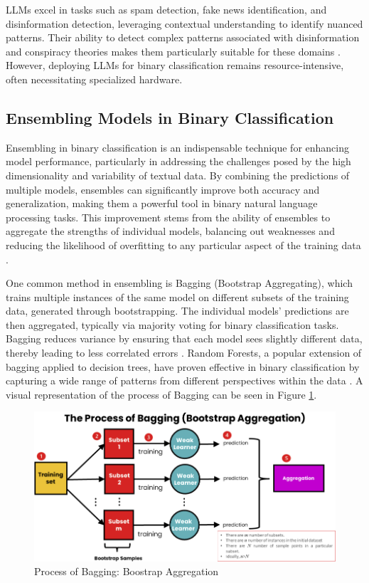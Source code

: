 \documentclass{Configuration_Files/PoliMi3i_thesis}
\begin{document}
LLMs excel in tasks such as spam detection, fake news identification, and disinformation detection, leveraging contextual understanding to identify nuanced patterns. Their ability to detect complex patterns associated with disinformation and conspiracy theories makes them particularly suitable for these domains \cite{vykopal2023disinformation}. However, deploying LLMs for binary classification remains resource-intensive, often necessitating specialized hardware.

\subsection{Ensembling Models in Binary Classification} \label{subsec:ensembling_models_in_binary_class}
Ensembling in binary classification is an indispensable technique for enhancing model performance, particularly in addressing the challenges posed by the high dimensionality and variability of textual data. By combining the predictions of multiple models, ensembles can significantly improve both accuracy and generalization, making them a powerful tool in binary natural language processing tasks. This improvement stems from the ability of ensembles to aggregate the strengths of individual models, balancing out weaknesses and reducing the likelihood of overfitting to any particular aspect of the training data \cite{zhou2012ensemble}.

One common method in ensembling is Bagging (Bootstrap Aggregating), which trains multiple instances of the same model on different subsets of the training data, generated through bootstrapping. The individual models' predictions are then aggregated, typically via majority voting for binary classification tasks. Bagging reduces variance by ensuring that each model sees slightly different data, thereby leading to less correlated errors \cite{breiman1996bagging}. Random Forests, a popular extension of bagging applied to decision trees, have proven effective in binary classification by capturing a wide range of patterns from different perspectives within the data \cite{breiman2001random}. A visual representation of the process of Bagging can be seen in Figure \ref{ensemble_bagging}.

\begin{figure}[h!] 
\centering 
\includegraphics[width=0.78\linewidth, height=0.25\textheight]{Images/bagging.png} 
\caption{Process of Bagging: Boostrap Aggregation \cite{odegua2019empirical}} 
\label{ensemble_bagging} 
\end{figure} 
\FloatBarrier
\end{document}
